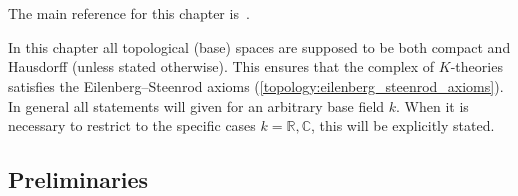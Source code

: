 \chapter{\texorpdfstring{}{K-theory}}\label{chapter:k}

    The main reference for this chapter is~\citet{karoubi_k-theory_1978}.

    In this chapter all topological (base) spaces are supposed to be both compact and Hausdorff (unless stated otherwise). This ensures that the complex of $K$-theories satisfies the Eilenberg--Steenrod axioms (\cref{topology:eilenberg_steenrod_axioms}). In general all statements will given for an arbitrary base field $k$. When it is necessary to restrict to the specific cases $k=\mathbb{R},\mathbb{C}$, this will be explicitly stated.

\section{Preliminaries}

